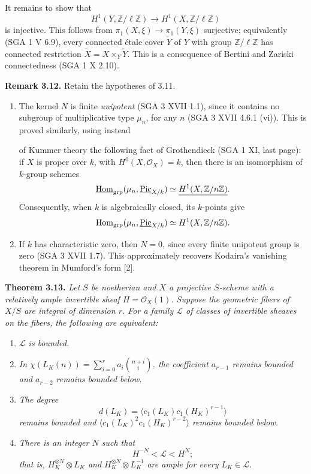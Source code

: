 It remains to show that
\[
H^1(Y,\mathbb Z/\ell\mathbb Z)\longrightarrow
H^1(X,\mathbb Z/\ell\mathbb Z)
\]
is injective. This follows from \(\pi_1(X,\xi)\to\pi_1(Y,\xi)\)
surjective; equivalently (SGA 1 V 6.9), every connected \'etale cover
\(\widetilde Y\) of \(Y\) with group \(\mathbb Z/\ell\mathbb Z\) has
connected restriction \(\widetilde X=X\times_Y\widetilde Y\). This is a
consequence of Bertini and Zariski connectedness (SGA 1 X 2.10).

\textbf{Remark 3.12.} Retain the hypotheses of 3.11.
\begin{enumerate}[label=(\roman*)]
\item The kernel \(N\) is finite \emph{unipotent} (SGA 3 XVII 1.1),
since it contains no subgroup of multiplicative type \(\mu_n\), for any
\(n\) (SGA 3 XVII 4.6.1 (vi)). This is proved similarly, using instead

of Kummer theory the following fact of Grothendieck (SGA 1 XI, last
page): if \(X\) is proper over \(k\), with \(H^0(X,\mathcal O_X)=k\),
then there is an isomorphism of \(k\)-group schemes
\[
\underline{\operatorname{Hom}}_{\mathrm{grp}}
(\mu_n,\underline{\operatorname{Pic}}_{X/k})
\simeq \underline{H^1(X,\mathbb Z/n\mathbb Z)}.
\]
Consequently, when \(k\) is algebraically closed, its \(k\)-points give
\[
\operatorname{Hom}_{\mathrm{grp}}(\mu_n,\underline{\operatorname{Pic}}_{X/k})
\simeq H^1(X,\mathbb Z/n\mathbb Z).
\]
\item If \(k\) has characteristic zero, then \(N=0\), since every finite
unipotent group is zero (SGA 3 XVII 1.7). This approximately recovers
Kodaira's vanishing theorem in Mumford's form [2].
\end{enumerate}

\textbf{Theorem 3.13.} \emph{Let \(S\) be noetherian and \(X\) a
projective \(S\)-scheme with a relatively ample invertible sheaf
\(H=\mathcal O_X(1)\). Suppose the geometric fibers of \(X/S\) are
integral of dimension \(r\). For a family \(\mathscr L\) of classes of
invertible sheaves on the fibers, the following are equivalent:}
\begin{enumerate}[label=(\roman*)]
\item \emph{\(\mathscr L\) is bounded.}
\item \emph{In
\(\chi(L_K(n))=\sum_{i=0}^{r}a_i\binom{n+i}{i}\),
the coefficient \(a_{r-1}\) remains bounded and \(a_{r-2}\) remains
bounded below.}
\item \emph{The degree
\[
d(L_K)=\langle c_1(L_K)c_1(H_K)^{r-1}\rangle
\]
remains bounded and
\(\langle c_1(L_K)^2c_1(H_K)^{r-2}\rangle\) remains bounded below.}
\item \emph{There is an integer \(N\) such that
\[
H^{-N}<\mathscr L<H^N;
\]
that is, \(H_K^{\otimes N}\otimes L_K\) and
\(H_K^{\otimes N}\otimes L_K^{-1}\) are ample for every
\(L_K\in\mathscr L\).}
\end{enumerate}

